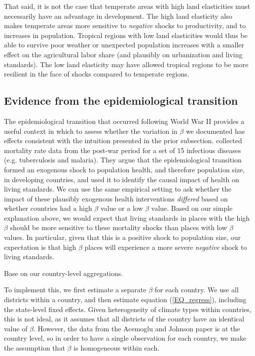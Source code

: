 \documentclass[11pt]{article}
\begin{document}
That said, it is not the case that temperate areas with high land elasticities must necessarily have an advantage in development. The high land elasticity also makes temperate areas more sensitive to \textit{negative} shocks to productivity, and to increases in population. Tropical regions with low land elasticities would thus be able to survive poor weather or unexpected population increases with a smaller effect on the agricultural labor share (and plausibly on urbanization and living standards). The low land elasticity may have allowed tropical regions to be more resilient in the face of shocks compared to temperate regions.

\subsection{Evidence from the epidemiological transition}\label{SEC_ajtest}
The epidemiological transition that occurred following World War II provides a useful context in which to assess whether the variation in $\beta$ we documented has effects consistent with the intuition presented in the prior subsection. \cite{aj07} collected mortality rate data from the post-war period for a set of 15 infectious diseases (e.g. tuberculosis and malaria). They argue that the epidemiological transition formed an exogenous shock to population health, and therefore population size, in developing countries, and used it to identify the causal impact of health on living standards. We can use the same empirical setting to ask whether the impact of these plausibly exogenous health interventions \textit{differed} based on whether countries had a high $\beta$ value or a low $\beta$ value. Based on our simple explanation above, we would expect that living standards in places with the high $\beta$ should be more sensitive to these mortality shocks than places with low $\beta$ values. In particular, given that this is a positive shock to population size, our expectation is that high $\beta$ places will experience a more severe \textit{negative} shock to living standards.

Base on our country-level aggregations.

To implement this, we first estimate a separate $\beta$ for each country. We use all districts within a country, and then estimate equation (\ref{EQ_regress}), including the state-level fixed effects. Given heterogeneity of climate types within countries, this is not ideal, as it assumes that all districts of the country have an identical value of $\beta$. However, the data from the Acemoglu and Johnson paper is at the country level, so in order to have a single observation for each country, we make the assumption that $\beta$ is homogeneous within each.
\end{document}
